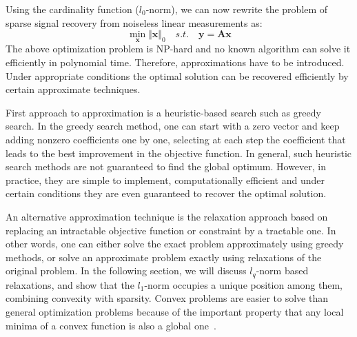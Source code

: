 \documentclass[journal]{IEEEtran}
\begin{document}

Using the cardinality function ($l_0$-norm), we can now rewrite the problem of sparse signal recovery from noiseless linear measurements as:
%
\begin{equation}
	\min_{\boldsymbol{x}}\Vert \boldsymbol{x}\Vert_0 \quad s.t. \quad \boldsymbol{y}=\boldsymbol{A} \boldsymbol{x}
\end{equation}
%
The above optimization problem is NP-hard and no known algorithm can solve it efficiently in polynomial time. Therefore, approximations have to be introduced. Under appropriate conditions the optimal solution can be recovered efficiently by certain approximate techniques.

First approach to approximation is a heuristic-based search such as greedy search. In the greedy search method, one can start with a zero vector and keep adding nonzero coefficients one by one, selecting at each step the coefficient that leads to the best improvement in the objective function. In general, such heuristic search methods are not guaranteed to find the global optimum. However, in practice, they are simple to implement, computationally efficient and under certain conditions they are even guaranteed to recover the optimal solution.

An alternative approximation technique is the relaxation approach based on replacing an intractable objective function or constraint by a tractable one. In other words, one can either solve the exact problem approximately using greedy methods, or solve an approximate problem exactly using relaxations of the original problem. In the following section, we will discuss $l_q$-norm based relaxations, and show that the $l_1$-norm occupies a unique position among them, combining convexity with sparsity. Convex problems are easier to solve than general optimization problems because of the important property that any local minima of a convex function is also a global one~\cite{Rish2015}.
\end{document}
